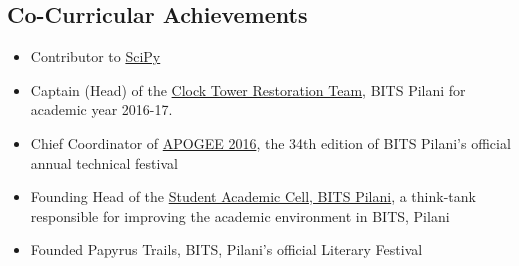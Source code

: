 \documentclass[margin, centered]{res}
\begin{document}
\begin{resume}
\section{Co-Curricular Achievements}
\begin{itemize}[leftmargin=*]
 \item Contributor to \href{https://www.scipy.org/}{SciPy}
 \item Captain (Head) of the \href{http://www.bits-clocktower.org/}{Clock Tower Restoration Team}, BITS Pilani for academic year 2016-17.
 \item Chief Coordinator of \href{https://bits-apogee.org/2016/}{APOGEE 2016}, the 34th edition of BITS Pilani's official annual technical festival
 \item Founding Head of the \href{https://sacbitspilani.wordpress.com/}{Student Academic Cell, BITS Pilani}, a think-tank responsible for improving the academic environment in BITS, Pilani
 \item Founded Papyrus Trails, BITS, Pilani's official Literary Festival
\end{itemize}




\end{resume}
\end{document}
